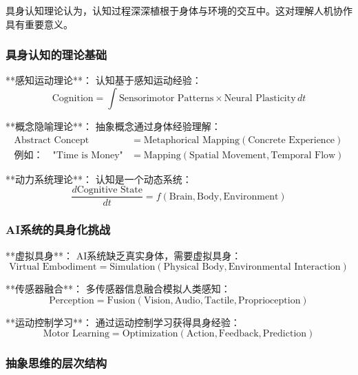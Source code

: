 具身认知理论认为，认知过程深深植根于身体与环境的交互中。这对理解人机协作具有重要意义。

\subsubsection{具身认知的理论基础} %

**感知运动理论**：
认知基于感知运动经验：
\begin{equation}
\text{Cognition} = \int \text{Sensorimotor Patterns} \times \text{Neural Plasticity} \, dt
\end{equation}

**概念隐喻理论**：
抽象概念通过身体经验理解：
\begin{align}
\text{Abstract Concept} &= \text{Metaphorical Mapping}(\text{Concrete Experience}) \\
\text{例如：} \quad \text{"Time is Money"} &= \text{Mapping}(\text{Spatial Movement}, \text{Temporal Flow})
\end{align}

**动力系统理论**：
认知是一个动态系统：
\begin{equation}
\frac{d\text{Cognitive State}}{dt} = f(\text{Brain}, \text{Body}, \text{Environment})
\end{equation}

\subsubsection{AI系统的具身化挑战} %

**虚拟具身**：
AI系统缺乏真实身体，需要虚拟具身：
\begin{equation}
\text{Virtual Embodiment} = \text{Simulation}(\text{Physical Body}, \text{Environmental Interaction})
\end{equation}

**传感器融合**：
多传感器信息融合模拟人类感知：
\begin{equation}
\text{Perception} = \text{Fusion}(\text{Vision}, \text{Audio}, \text{Tactile}, \text{Proprioception})
\end{equation}

**运动控制学习**：
通过运动控制学习获得具身经验：
\begin{equation}
\text{Motor Learning} = \text{Optimization}(\text{Action}, \text{Feedback}, \text{Prediction})
\end{equation}

\subsubsection{抽象思维的层次结构} %

